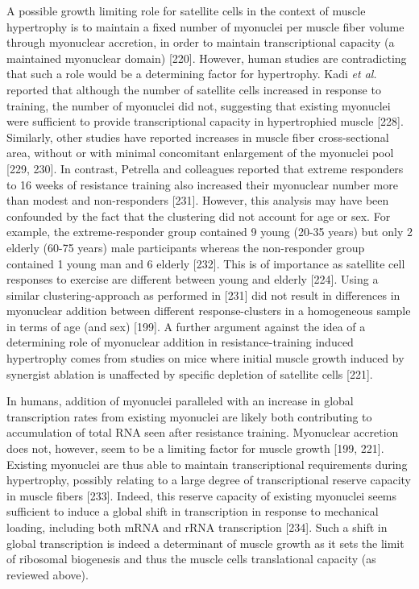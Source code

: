 \documentclass[twoside,10pt]{gihclass} %
\begin{document}
A possible growth limiting role for satellite cells in the context of muscle hypertrophy is to maintain a fixed number of myonuclei per muscle fiber volume through myonuclear accretion, in order to maintain transcriptional capacity (a maintained myonuclear domain)
{[}220{]}.
However, human studies are contradicting that such a role would be a determining factor for hypertrophy.
Kadi \emph{et al.} reported that although the number of satellite cells increased in response to training, the number of myonuclei did not,
suggesting that existing myonuclei were sufficient to provide transcriptional capacity in hypertrophied muscle
{[}228{]}.
Similarly, other studies have reported increases in muscle fiber cross-sectional area, without or with minimal concomitant enlargement of the myonuclei pool
{[}229, 230{]}.
In contrast, Petrella and colleagues reported that extreme responders to 16 weeks of resistance training also increased their myonuclear number more than modest and non-responders
{[}231{]}.
However, this analysis may have been confounded by the fact that the clustering did not account for age or sex. For example, the extreme-responder group contained 9 young (20-35 years) but only 2 elderly (60-75 years) male participants whereas the non-responder group contained 1 young man and 6 elderly
{[}232{]}.
This is of importance as satellite cell responses to exercise are different between young and elderly
{[}224{]}.
Using a similar clustering-approach as performed in {[}231{]} did not result in differences in myonuclear addition between different response-clusters in a homogeneous sample in terms of age (and sex)
{[}199{]}.
A further argument against the idea of a determining role of myonuclear addition in resistance-training induced hypertrophy comes from studies on mice where initial muscle growth induced by synergist ablation is unaffected by specific depletion of satellite cells
{[}221{]}.

In humans, addition of myonuclei paralleled with an increase in global transcription rates from existing myonuclei are likely both contributing to accumulation of total RNA seen after resistance training.
Myonuclear accretion does not, however, seem to be a limiting factor for muscle growth
{[}199, 221{]}.
Existing myonuclei are thus able to maintain transcriptional requirements during hypertrophy, possibly relating to a large degree of transcriptional reserve capacity in muscle fibers
{[}233{]}.
Indeed, this reserve capacity of existing myonuclei seems sufficient to induce a global shift in transcription in response to mechanical loading, including both mRNA and rRNA transcription
{[}234{]}.
Such a shift in global transcription is indeed a determinant of muscle growth as it sets the limit of ribosomal biogenesis and thus the muscle cells translational capacity (as reviewed above).
\end{document}

